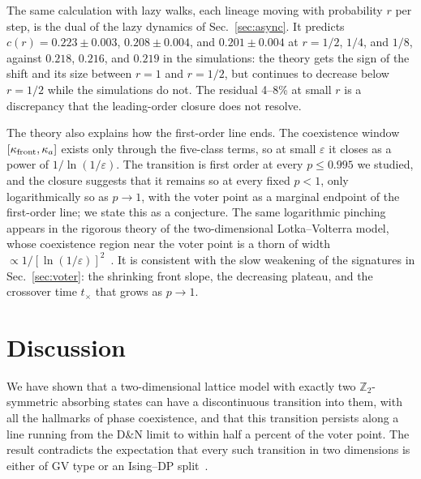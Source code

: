 \documentclass[pre,twocolumn,superscriptaddress,showpacs,floatfix]{revtex4-2}
\begin{document}
The same calculation with lazy walks, each lineage moving with probability $r$ per step, is the
dual of the lazy dynamics of Sec.~\ref{sec:async}. It predicts $c(r) = 0.223\pm0.003$,
$0.208\pm0.004$, and $0.201\pm0.004$ at $r = 1/2$, $1/4$, and $1/8$, against $0.218$, $0.216$,
and $0.219$ in the simulations: the theory gets the sign of the shift and its size between $r = 1$
and $r = 1/2$, but continues to decrease below $r = 1/2$ while the simulations do not. The
residual 4--8\% at small $r$ is a discrepancy that the leading-order closure does not resolve.

The theory also explains how the first-order line ends. The coexistence window
$[\kappa_{\rm front},\kappa_a]$ exists only through the five-class terms, so at small
$\varepsilon$ it closes as a power of $1/\ln(1/\varepsilon)$. The transition is first order at
every $p\le 0.995$ we studied, and the closure suggests that it remains so at every fixed $p<1$,
only logarithmically so as $p\to 1$, with the voter point as a marginal endpoint of the
first-order line; we state this as a conjecture. The same logarithmic pinching appears in the rigorous theory
of the two-dimensional Lotka--Volterra model, whose coexistence region near the voter point is a
thorn of width $\propto 1/[\ln(1/\varepsilon)]^2$~\cite{cox2010}. It is consistent with the
slow weakening of the signatures in Sec.~\ref{sec:voter}: the shrinking front slope, the
decreasing plateau, and the crossover time $t_\times$ that grows as $p\to 1$.

\section{Discussion}
\label{sec:discussion}

We have shown that a two-dimensional lattice model with exactly two $\mathbb{Z}_2$-symmetric
absorbing states can have a discontinuous transition into them, with all the hallmarks of phase
coexistence, and that this transition persists along a line running from the D\&N limit to
within half a percent of the voter point. The result contradicts the expectation that every such
transition in two dimensions is either of GV type or an Ising--DP
split~\cite{dornic2001,alhammal2005,castellano2009}.
\end{document}
